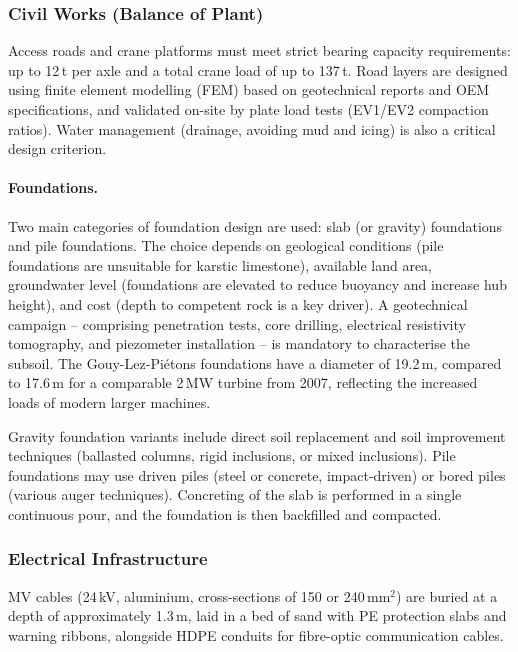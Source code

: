 \subsubsection{Civil Works (Balance of Plant)}

Access roads and crane platforms must meet strict bearing capacity requirements: up to
12\,t per axle and a total crane load of up to 137\,t. Road layers are designed using
finite element modelling (FEM) based on geotechnical reports and OEM specifications, and
validated on-site by plate load tests (EV1/EV2 compaction ratios). Water management
(drainage, avoiding mud and icing) is also a critical design criterion.

\paragraph{Foundations.}
Two main categories of foundation design are used: slab (or gravity) foundations and pile
foundations. The choice depends on geological conditions (pile foundations are unsuitable
for karstic limestone), available land area, groundwater level (foundations are elevated to
reduce buoyancy and increase hub height), and cost (depth to competent rock is a key driver).
A geotechnical campaign -- comprising penetration tests, core drilling, electrical
resistivity tomography, and piezometer installation -- is mandatory to characterise the
subsoil. The Gouy-Lez-Pi\'etons foundations have a diameter of 19.2\,m, compared to
17.6\,m for a comparable 2\,MW turbine from 2007, reflecting the increased loads of modern
larger machines.

Gravity foundation variants include direct soil replacement and soil improvement techniques
(ballasted columns, rigid inclusions, or mixed inclusions). Pile foundations may use driven
piles (steel or concrete, impact-driven) or bored piles (various auger techniques).
Concreting of the slab is performed in a single continuous pour, and the foundation is
then backfilled and compacted.

\subsubsection{Electrical Infrastructure}

MV cables (24\,kV, aluminium, cross-sections of 150 or 240\,mm$^2$) are buried at a
depth of approximately 1.3\,m, laid in a bed of sand with PE protection slabs and warning
ribbons, alongside HDPE conduits for fibre-optic communication cables.

